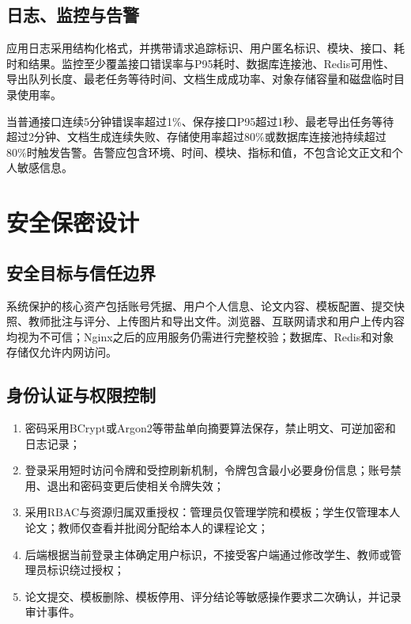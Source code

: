 \documentclass{../template/softeng}
\begin{document}
	\subsection{日志、监控与告警}
	应用日志采用结构化格式，并携带请求追踪标识、用户匿名标识、模块、接口、耗时和结果。监控至少覆盖接口错误率与P95耗时、数据库连接池、Redis可用性、导出队列长度、最老任务等待时间、文档生成成功率、对象存储容量和磁盘临时目录使用率。
	
	当普通接口连续5分钟错误率超过1\%、保存接口P95超过1秒、最老导出任务等待超过2分钟、文档生成连续失败、存储使用率超过80\%或数据库连接池持续超过80\%时触发告警。告警应包含环境、时间、模块、指标和值，不包含论文正文和个人敏感信息。
	
	\section{安全保密设计}
	
	\subsection{安全目标与信任边界}
	系统保护的核心资产包括账号凭据、用户个人信息、论文内容、模板配置、提交快照、教师批注与评分、上传图片和导出文件。浏览器、互联网请求和用户上传内容均视为不可信；Nginx之后的应用服务仍需进行完整校验；数据库、Redis和对象存储仅允许内网访问。
	
	\subsection{身份认证与权限控制}
	\begin{enumerate}
		\item 密码采用BCrypt或Argon2等带盐单向摘要算法保存，禁止明文、可逆加密和日志记录；
		\item 登录采用短时访问令牌和受控刷新机制，令牌包含最小必要身份信息；账号禁用、退出和密码变更后使相关令牌失效；
		\item 采用RBAC与资源归属双重授权：管理员仅管理学院和模板；学生仅管理本人论文；教师仅查看并批阅分配给本人的课程论文；
		\item 后端根据当前登录主体确定用户标识，不接受客户端通过修改学生、教师或管理员标识绕过授权；
		\item 论文提交、模板删除、模板停用、评分结论等敏感操作要求二次确认，并记录审计事件。
	\end{enumerate}
	
\end{document}
